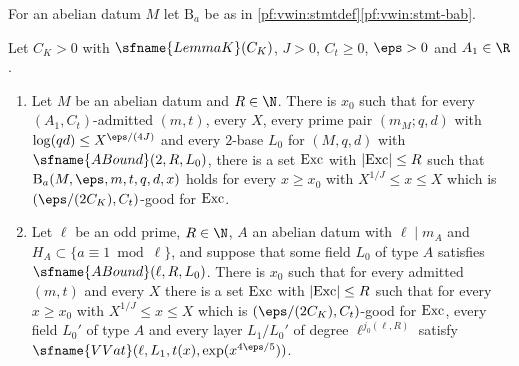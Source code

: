 For an abelian datum $M$ let $\mathrm{B}_a$ be as in \cref{pf:vwin:stmtdef}\ref{pf:vwin:stmt-bab}.

\begin{lemma}\label{pf:vwin:parts-ab}
Let $C_K>0$ with $\sfname{LemmaK}(C_K)$, $J>0$, $C_t\ge0$, $\eps>0$ and $A_1\in\R$.
\begin{enumerate}[label=(\alph*)]
\item\label{pf:vwin:ab-two} Let $M$ be an abelian datum and $R\in\N$. There is $x_0$ such that for every $(A_1,C_t)$-admitted $(m,t)$, every
$X$, every prime pair $(m_M;q,d)$ with $\log(qd)\le X^{\eps/(4J)}$ and every $2$-base $L_0$ for $(M,q,d)$ with $\sfname{ABound}(2,R,L_0)$,
there is a set $\mathrm{Exc}$ with $|\mathrm{Exc}|\le R$ such that $\mathrm{B}_a(M,\eps,m,t,q,d,x)$ holds for every $x\ge x_0$ with
$X^{1/J}\le x\le X$ which is $(\eps/(2C_K),C_t)$-good for $\mathrm{Exc}$.
\item\label{pf:vwin:ab-bad} Let $\ell$ be an odd prime, $R\in\N$, $A$ an abelian datum with $\ell\mid m_A$ and $H_A\subset\{a\equiv1\bmod\ell\}$, and
suppose that some field $L_0$ of type $A$ satisfies $\sfname{ABound}(\ell,R,L_0)$. There is $x_0$ such that for every admitted $(m,t)$ and
every $X$ there is a set $\mathrm{Exc}$ with $|\mathrm{Exc}|\le R$ such that for every $x\ge x_0$ with $X^{1/J}\le x\le X$ which is
$(\eps/(2C_K),C_t)$-good for $\mathrm{Exc}$, every field $L_0'$ of type $A$ and every layer $L_1/L_0'$ of degree $\ell^{j_0(\ell,R)}$ satisfy
$\sfname{VVat}(\ell,L_1,t(x),\exp(x^{4\eps/5}))$.
\end{enumerate}
\end{lemma}

